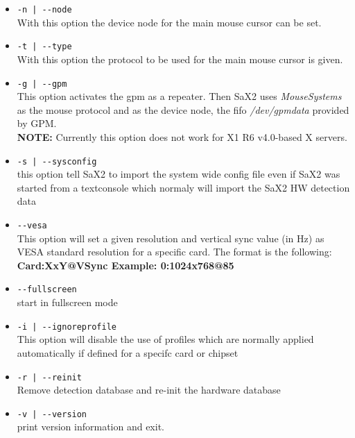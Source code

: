 \begin{itemize}
\item \verb+-n | --node+\\  
      With this option the device node for the main mouse cursor can be set.

\item \verb+-t | --type+\\
      With this  option the protocol to be used for the main mouse cursor
      is given. 

\item \verb+-g | --gpm+\\
      This option activates the gpm as a repeater. Then SaX2 uses 
      \textit{MouseSystems} as the mouse protocol and as the device node, the
      fifo \textit{/dev/gpmdata} provided by GPM.\\
      \textbf{NOTE:} Currently this option does not work for X1 R6 v4.0-based
      X servers.

\item \verb+-s | --sysconfig+\\
      this option tell SaX2 to import the system wide config file even
      if SaX2 was started from a textconsole which normaly will import
      the SaX2 HW detection data

\item \verb+--vesa+\\
      This  option will set a given resolution and vertical sync value
      (in Hz) as VESA standard resolution for  a  specific  card.  The
      format is the following: \textbf{Card:XxY@VSync Example: 0:1024x768@85}

\item \verb+--fullscreen+\\
      start in fullscreen mode

\item \verb+-i | --ignoreprofile+\\
      This option will disable the use of profiles which are normally
      applied automatically if defined for a specifc card or chipset

\item \verb+-r | --reinit+\\
      Remove detection database and re-init the hardware database

\item \verb+-v | --version+\\
      print version information and exit.
\end{itemize}

\newpage
 
